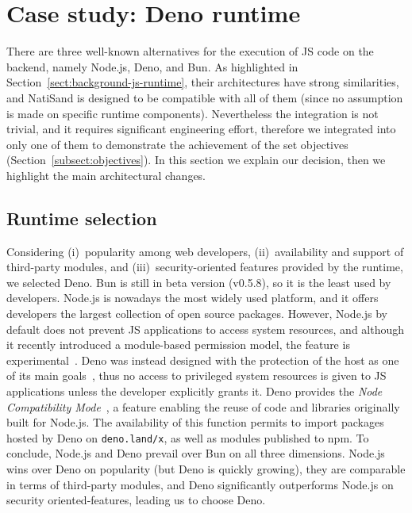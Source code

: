 \section{Case study: Deno runtime}
\label{sect:case-study-deno}

There are three well-known alternatives for the execution of JS code
on the backend, namely Node.js, Deno, and Bun. As highlighted in
Section~\ref{sect:background-js-runtime}, their architectures have
strong similarities, and NatiSand is designed to be compatible with
all of them (since no assumption is made on specific runtime
components). Nevertheless the integration is not trivial, and it requires
significant engineering effort, therefore we integrated \natisand into only
one of them to demonstrate the achievement of the set objectives
(Section~\ref{subsect:objectives}). In this section we explain our
decision, then we highlight the main architectural changes.

\subsection{Runtime selection}
\label{sect:deno-selection}

Considering (i)~popularity among web developers, (ii)~availability and
support of third-party modules, and (iii)~security-oriented features
provided by the runtime, we selected Deno. Bun is still in beta
version (v0.5.8), so it is the least used by developers.
Node.js is nowadays the most
widely used platform, and it offers developers the largest collection
of open source packages. However, Node.js by default does not prevent
JS applications to access system resources, and although it
recently introduced a module-based permission model, the feature is
experimental~\cite{node-permissions}. Deno was instead designed with the protection of
the host as one of its main goals~\cite{nodejs-regret}, thus no access to privileged system
resources is given to JS applications unless the developer
explicitly grants it. Deno provides the
{\em Node Compatibility Mode}~\cite{deno-compatibility-mode}, a
feature enabling the reuse of
code and libraries originally built for Node.js. The availability of
this function permits to
import packages hosted by Deno on {\tt deno.land/x}, as well as
modules published to npm. To conclude, Node.js and Deno prevail
over Bun on all three dimensions. Node.js wins over Deno on
popularity (but Deno is quickly growing), they are comparable in terms
of third-party modules, and Deno significantly outperforms Node.js on
security oriented-features, leading us to choose Deno.

